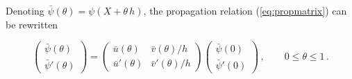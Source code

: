 Denoting $\bar{\psi}(\theta) =\psi(X+\theta\,h)$, the propagation relation (\ref{eq:propmatrix}) can be rewritten

\begin{equation}
  \begin{pmatrix}\bar{\psi}(\theta)\\ \bar{\psi}'(\theta)\end{pmatrix}
  = \begin{pmatrix} \bar{u}(\theta) & \bar{v}(\theta)/h \\ \bar{u}'(\theta) & \bar{v}'(\theta)/h \end{pmatrix} \begin{pmatrix} \bar{\psi}(0) \\ \bar{\psi}'(0) \end{pmatrix} \,, \qquad %
  0 \leq \theta \leq 1 \,. \label{eq:propmatrix2}
\end{equation}

